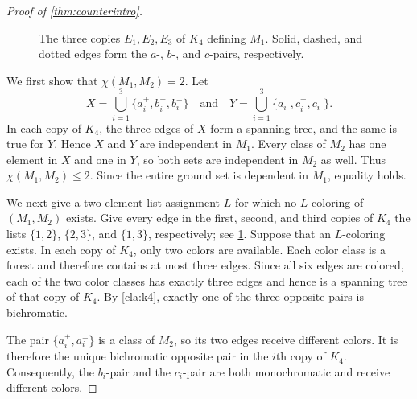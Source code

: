 \documentclass[10pt,a4paper]{article}
\theoremstyle{plain}
\theoremstyle{definition}
\begin{document}
\begin{proof}[Proof of \cref{thm:counterintro}]
\begin{figure}[t]
\caption{The three copies $E_1,E_2,E_3$ of $K_4$ defining $M_1$. Solid, dashed, and dotted edges form the $a$-, $b$-, and $c$-pairs, respectively.}
\label{fig:construction}
\end{figure}

We first show that $\chi(M_1,M_2)=2$. Let
\[
X=\bigcup_{i=1}^3\{a_i^+,b_i^+,b_i^-\}\quad\text{and}\quad Y=\bigcup_{i=1}^3\{a_i^-,c_i^+,c_i^-\}.
\]
In each copy of $K_4$, the three edges of $X$ form a spanning tree, and the same is true for $Y$. Hence $X$ and $Y$ are independent in $M_1$. Every class of $M_2$ has one element in $X$ and one in $Y$, so both sets are independent in $M_2$ as well. Thus $\chi(M_1,M_2)\le2$. Since the entire ground set is dependent in $M_1$, equality holds.

We next give a two-element list assignment $L$ for which no $L$-coloring of $(M_1,M_2)$ exists. Give every edge in the first, second, and third copies of $K_4$ the lists $\{1,2\}$, $\{2,3\}$, and $\{1,3\}$, respectively; see \cref{fig:construction}. Suppose that an $L$-coloring exists. In each copy of $K_4$, only two colors are available. Each color class is a forest and therefore contains at most three edges. Since all six edges are colored, each of the two color classes has exactly three edges and hence is a spanning tree of that copy of $K_4$. By \cref{cla:k4}, exactly one of the three opposite pairs is bichromatic.

The pair $\{a_i^+,a_i^-\}$ is a class of $M_2$, so its two edges receive different colors. It is therefore the unique bichromatic opposite pair in the $i$th copy of $K_4$. Consequently, the $b_i$-pair and the $c_i$-pair are both monochromatic and receive different colors.


\end{proof}
\end{document}
